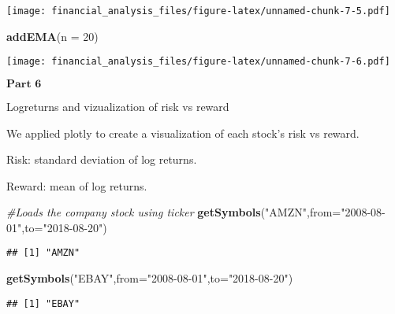 \documentclass[]{article}
\newenvironment{Shaded}{\begin{snugshade}}{\end{snugshade}}
\newcommand{\KeywordTok}[1]{\textcolor[rgb]{0.13,0.29,0.53}{\textbf{#1}}}
\newcommand{\DataTypeTok}[1]{\textcolor[rgb]{0.13,0.29,0.53}{#1}}
\newcommand{\DecValTok}[1]{\textcolor[rgb]{0.00,0.00,0.81}{#1}}
\newcommand{\StringTok}[1]{\textcolor[rgb]{0.31,0.60,0.02}{#1}}
\newcommand{\CommentTok}[1]{\textcolor[rgb]{0.56,0.35,0.01}{\textit{#1}}}
\newcommand{\NormalTok}[1]{#1}
\begin{document}
\texttt{[image: financial\_analysis\_files/figure-latex/unnamed-chunk-7-5.pdf]}

\begin{Shaded}
\begin{Highlighting}[]
\KeywordTok{addEMA}\NormalTok{(}\DataTypeTok{n =} \DecValTok{20}\NormalTok{)}
\end{Highlighting}
\end{Shaded}

\texttt{[image: financial\_analysis\_files/figure-latex/unnamed-chunk-7-6.pdf]}

\(\textbf{Part 6}\)

Logreturns and vizualization of risk vs reward

We applied plotly to create a visualization of each stock's risk vs
reward.

Risk: standard deviation of log returns.

Reward: mean of log returns.

\begin{Shaded}
\begin{Highlighting}[]
\CommentTok{#Loads the company stock using ticker}
\KeywordTok{getSymbols}\NormalTok{(}\StringTok{"AMZN"}\NormalTok{,}\DataTypeTok{from=}\StringTok{"2008-08-01"}\NormalTok{,}\DataTypeTok{to=}\StringTok{"2018-08-20"}\NormalTok{)}
\end{Highlighting}
\end{Shaded}

\begin{verbatim}
## [1] "AMZN"
\end{verbatim}

\begin{Shaded}
\begin{Highlighting}[]
\KeywordTok{getSymbols}\NormalTok{(}\StringTok{"EBAY"}\NormalTok{,}\DataTypeTok{from=}\StringTok{"2008-08-01"}\NormalTok{,}\DataTypeTok{to=}\StringTok{"2018-08-20"}\NormalTok{)}
\end{Highlighting}
\end{Shaded}

\begin{verbatim}
## [1] "EBAY"
\end{verbatim}
\end{document}
